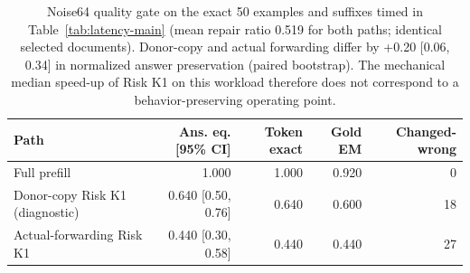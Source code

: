\begin{table}[t]
\centering
\footnotesize
\begin{tabular}{lrrrr}
\toprule
Path & Ans. eq. [95\% CI] & Token exact & Gold EM & Changed-wrong \\
\midrule
Full prefill & 1.000 & 1.000 & 0.920 & 0 \\
Donor-copy Risk K1 (diagnostic) & 0.640 [0.50, 0.76] & 0.640 & 0.600 & 18 \\
Actual-forwarding Risk K1 & 0.440 [0.30, 0.58] & 0.440 & 0.440 & 27 \\
\bottomrule
\end{tabular}
\caption{Noise64 quality gate on the exact 50 examples and suffixes timed in Table~\ref{tab:latency-main} (mean repair ratio 0.519 for both paths; identical selected documents). Donor-copy and actual forwarding differ by +0.20 [0.06, 0.34] in normalized answer preservation (paired bootstrap). The mechanical median speed-up of Risk K1 on this workload therefore does not correspond to a behavior-preserving operating point.}
\label{tab:app-noise64-gate}
\end{table}

